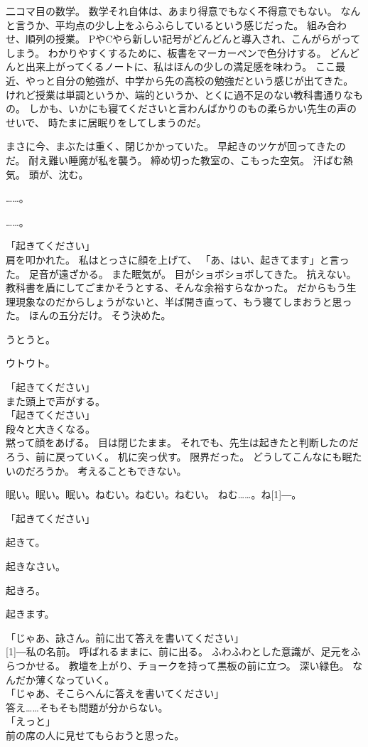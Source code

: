 \documentclass[../IHMain]{subfiles}
\begin{document}
二コマ目の数学。
数学それ自体は、あまり得意でもなく不得意でもない。
なんと言うか、平均点の少し上をふらふらしているという感じだった。
組み合わせ、順列の授業。
PやCやら新しい記号がどんどんと導入され、こんがらがってしまう。
わかりやすくするために、板書をマーカーペンで色分けする。
どんどんと出来上がってくるノートに、私はほんの少しの満足感を味わう。
ここ最近、やっと自分の勉強が、中学から先の高校の勉強だという感じが出てきた。
けれど授業は単調というか、端的というか、とくに過不足のない教科書通りなもの。
しかも、いかにも寝てくださいと言わんばかりのもの柔らかい先生の声のせいで、
時たまに居眠りをしてしまうのだ。

まさに今、まぶたは重く、閉じかかっていた。
早起きのツケが回ってきたのだ。
耐え難い睡魔が私を襲う。
締め切った教室の、こもった空気。
汗ばむ熱気。
頭が、沈む。

……。

……。

「起きてください」\\
肩を叩かれた。
私はとっさに顔を上げて、
「あ、はい、起きてます」と言った。
足音が遠ざかる。
また眠気が。
目がショボショボしてきた。
抗えない。
教科書を盾にしてごまかそうとする、そんな余裕すらなかった。
だからもう生理現象なのだからしょうがないと、半ば開き直って、もう寝てしまおうと思った。
ほんの五分だけ。
そう決めた。

うとうと。

ウトウト。

「起きてください」\\
また頭上で声がする。\\
「起きてください」\\
段々と大きくなる。\\
黙って顔をあげる。
目は閉じたまま。
それでも、先生は起きたと判断したのだろう、前に戻っていく。
机に突っ伏す。
限界だった。
どうしてこんなにも眠たいのだろうか。
考えることもできない。

眠い。眠い。眠い。ねむい。ねむい。ねむい。
ねむ……。ね\scalebox{3}[1]{―}。

「起きてください」

起きて。

起きなさい。

起きろ。

起きます。

「じゃあ、詠さん。前に出て答えを書いてください」\\
\scalebox{3}[1]{―}私の名前。
呼ばれるままに、前に出る。
ふわふわとした意識が、足元をふらつかせる。
教壇を上がり、チョークを持って黒板の前に立つ。
深い緑色。
なんだか薄くなっていく。\\
「じゃあ、そこらへんに答えを書いてください」\\
答え……そもそも問題が分からない。\\
「えっと」\\
前の席の人に見せてもらおうと思った。
\end{document}
